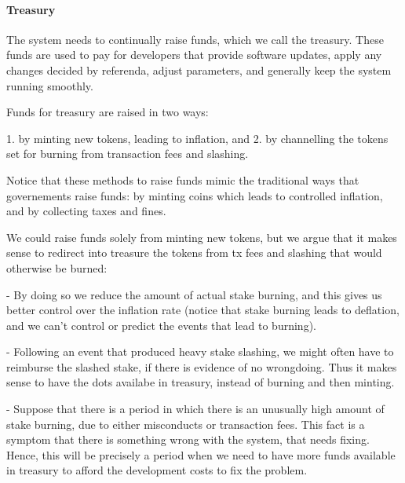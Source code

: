  \paragraph{Treasury}

 The system needs to continually raise funds, which we call the treasury. These funds are used to pay for developers that provide software updates, apply any changes decided by referenda, adjust parameters, and generally keep the system running smoothly.

 Funds for treasury are raised in two ways:

 1.   by minting new tokens, leading to inflation, and
 2.   by channelling the tokens set for burning from transaction fees and slashing.

 Notice that these methods to raise funds mimic the traditional ways that governements raise funds: by minting coins which leads to controlled inflation, and by collecting taxes and fines.

 We could raise funds solely from minting new tokens, but we argue that it makes sense to redirect into treasure the tokens from tx fees and slashing that would otherwise be burned:

 - By doing so we reduce the amount of actual stake burning, and this gives us better control over the inflation rate (notice that stake burning leads to deflation, and we can’t control or predict the events that lead to burning).

 - Following an event that produced heavy stake slashing, we might often have to reimburse the slashed stake, if there is evidence of no wrongdoing. Thus it makes sense to have the dots availabe in treasury, instead of burning and then minting.

 - Suppose that there is a period in which there is an unusually high amount of stake burning, due to either misconducts or transaction fees. This fact is a symptom that there is something wrong with the system, that needs fixing. Hence, this will be precisely a period when we need to have more funds available in treasury to afford the development costs to fix the problem.
